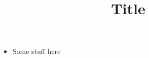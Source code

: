 \documentclass{article}
\title{Title}
\date{}
\begin{document}
	\maketitle
	 
		\begin{itemize}
			\item Some stuff here
		\end{itemize}
\end{document}
